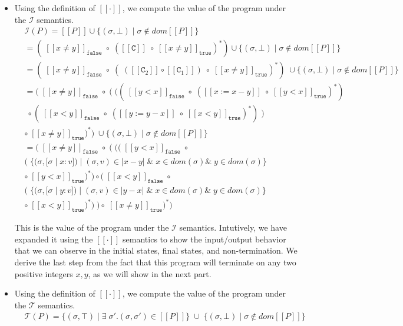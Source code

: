 \documentclass{article}
\newcommand{\C}{\mathtt{C}}
\newcommand{\true}{\mathtt{true}}
\newcommand{\false}{\mathtt{false}}
\begin{document}
\begin{enumerate}
\begin{itemize}
\begin{itemize}
	\item Using the definition of $[[\cdot]]$, we compute the value of the
	program under the $\mathcal{I}$ semantics.
	\begin{align*}	
	& \mathcal{I}(P) = [[ P ]] \cup  \{ (\sigma, \bot) \; | \; \sigma
	\notin dom [[ P ]] \} \\
	& = (\; [[x \neq y]]_{\false} \; \circ \; ([[\C]] \; \circ \; [[x \neq
	y]]_{\true} )^{*} ) \cup  \{ (\sigma, \bot) \; | \; \sigma	\notin dom [[ P ]]
	\}\\
	& = (\; [[x \neq y]]_{\false} \; \circ \; ( \; ( [[\C_2]] \circ [[\C_1]] ) \;
	\circ \; [[x \neq y]]_{\true} )^{*} ) \; \cup  \{ (\sigma, \bot) \; | \; \sigma
	\notin dom [[ P ]] \}\\
	& = (\; [[x \neq y]]_{\false} \; \circ \; ( \; ( 
	(\; [[y < x]]_{\false} \; \circ \; ([[x := x - y]] \; \circ \; [[y <
	x]]_{\true} )^{*}) \\
	& \; \circ 
	(\; [[x < y]]_{\false} \; \circ \; ([[y := y - x]] \; \circ \; [[x <
	y]]_{\true} )^{*} ) \; )\\
	& \circ \; [[x \neq y]]_{\true} )^{*} ) \; \cup  \{ (\sigma, \bot) \; | \;
	\sigma \notin dom [[ P ]] \} \\
	& =	(\; [[x \neq y]]_{\false} \; \circ \; ( \; ( 
	(\; [[y < x]]_{\false} \; \circ \; \\
	& (\; \{ (\sigma, [\sigma \; | \; x : v]) \; |
	\; (\sigma, v) \in | x - y | \; \& \; x \in dom(\sigma) \& \; y \in dom(\sigma)
	\} \; \\
	& \circ \; [[y < x]]_{\true} )^{*}) \circ (\; [[x < y]]_{\false} \; \circ \; \\
	& (\; \{ (\sigma, [\sigma \; | \; y : v]) \; |
	\; (\sigma, v) \in | y - x | \; \& \; x \in dom(\sigma) \& \; y \in dom(\sigma)
	\} \; \\ 
	& \circ \; [[x < y]]_{\true} )^{*} ) \; ) \circ \; [[x \neq y]]_{\true} )^{*}) \;
	\end{align*}

	This is the value of the program under the $\mathcal{I}$ semantics.
	Intutively, we have expanded it using the $[[\cdot]]$ semantics to
	show the input/output behavior that we can observe in the initial states, final
	states, and non-termination.
	We derive the last step from the fact that this program will terminate on any
	two positive integers $x, y$, as we will show in the next part.

	\item Using the definition of $[[\cdot]]$, we compute the value of the
	program under the $\mathcal{T}$ semantics.
	\begin{align*}	
	& \mathcal{T}(P) = \{ ( \sigma, \top ) \; | \; \exists \; \sigma'.(\sigma,
	\sigma') \in [[ P ]] \} \; \cup \; \{ ( \sigma, \bot) \; | \; \sigma \notin dom
	[[ P ]] \} \\
	\end{align*}


\end{itemize}
\end{itemize}
\end{enumerate}
\end{document}

